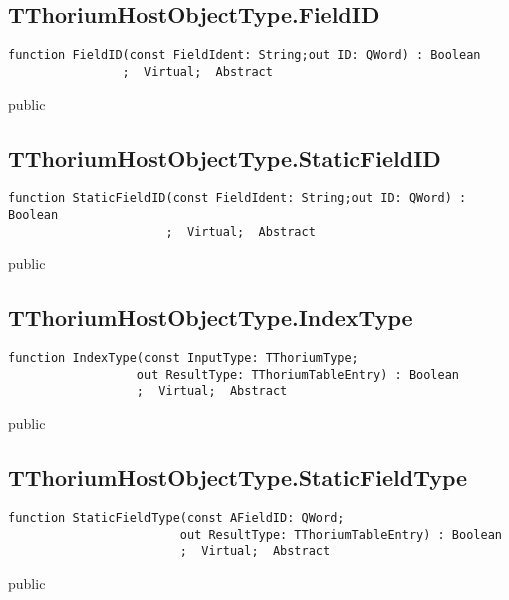 \subsection{TThoriumHostObjectType.FieldID}
\label{thoriumcore:thorium:tthoriumhostobjecttype:fieldid}
\begin{FPCList}
\Synopsis
\Declaration 

\begin{verbatim}
function FieldID(const FieldIdent: String;out ID: QWord) : Boolean
                ;  Virtual;  Abstract
\end{verbatim}
\Visibility
public
\Description
\Errors
\end{FPCList}
\subsection{TThoriumHostObjectType.StaticFieldID}
\label{thoriumcore:thorium:tthoriumhostobjecttype:staticfieldid}
\begin{FPCList}
\Synopsis
\Declaration 

\begin{verbatim}
function StaticFieldID(const FieldIdent: String;out ID: QWord) : Boolean
                      ;  Virtual;  Abstract
\end{verbatim}
\Visibility
public
\Description
\Errors
\end{FPCList}
\subsection{TThoriumHostObjectType.IndexType}
\label{thoriumcore:thorium:tthoriumhostobjecttype:indextype}
\begin{FPCList}
\Synopsis
\Declaration 

\begin{verbatim}
function IndexType(const InputType: TThoriumType;
                  out ResultType: TThoriumTableEntry) : Boolean
                  ;  Virtual;  Abstract
\end{verbatim}
\Visibility
public
\Description
\Errors
\end{FPCList}
\subsection{TThoriumHostObjectType.StaticFieldType}
\label{thoriumcore:thorium:tthoriumhostobjecttype:staticfieldtype}
\begin{FPCList}
\Synopsis
\Declaration 

\begin{verbatim}
function StaticFieldType(const AFieldID: QWord;
                        out ResultType: TThoriumTableEntry) : Boolean
                        ;  Virtual;  Abstract
\end{verbatim}
\Visibility
public
\Description
\Errors
\end{FPCList}
